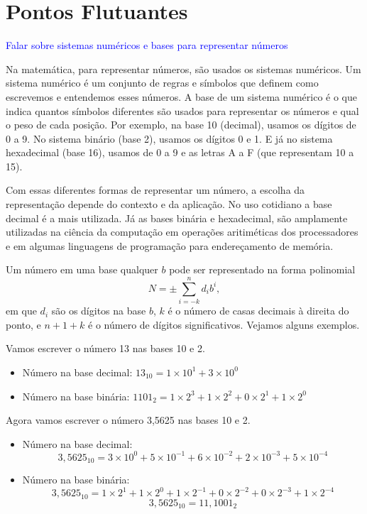 \chapter{Pontos Flutuantes}

\textcolor{blue}{Falar sobre sistemas numéricos e bases para representar números}

Na matemática, para representar números, são usados os sistemas numéricos. Um sistema numérico é um conjunto de regras e símbolos que definem como escrevemos e entendemos esses números. 
A base de um sistema numérico é o que indica quantos símbolos diferentes são usados para representar os números e qual o peso de cada posição. Por exemplo, na base 10 (decimal), usamos os dígitos de 0 a 9. No sistema binário (base 2), usamos os dígitos 0 e 1. E já no sistema hexadecimal (base 16), usamos de 0 a 9 e as letras A a F (que representam 10 a 15).

Com essas diferentes formas de representar um número, a escolha da representação depende do contexto e da aplicação. No uso cotidiano a base decimal é a mais utilizada. Já as bases binária e hexadecimal, são amplamente utilizadas na ciência da computação em operações aritiméticas dos processadores e em algumas linguagens de programação para endereçamento de memória.

Um número em uma base qualquer \(b\) pode ser representado na forma polinomial
\begin{equation}
N = \pm \sum_{i=-k}^{n} d_i b^i,
\end{equation}
em que \(d_i\) são os dígitos na base \(b\), \(k\) é o número de casas decimais à direita do ponto, e \(n+1+k\) é o número de dígitos significativos. Vejamos alguns exemplos.

\begin{ex}
Vamos escrever o número 13 nas bases 10 e 2.
\begin{itemize}
    \item Número na base decimal: \(13_{10} = 1 \times 10^1 + 3 \times 10^0\)
    \item Número na base binária: \(1101_2 = 1 \times 2^3 + 1 \times 2^2 + 0 \times 2^1 + 1 \times 2^0  \)
\end{itemize}
\end{ex}

\begin{ex}
Agora vamos escrever o número 3,5625 nas bases 10 e 2.

\begin{itemize}
    \item Número na base decimal: 
    \[
    3{,}5625_{10} = 3 \times 10^0 + 5 \times 10^{-1} + 6 \times 10^{-2} + 2 \times 10^{-3} + 5 \times 10^{-4}
    \]
    
    \item Número na base binária:
    \[
    3{,}5625_{10} = 1\times 2^{1} + 1 \times 2^0 + 1 \times 2^{-1} + 0 \times 2^{-2} + 0 \times 2^{-3} + 1 \times 2^{-4}
    \]
    \[
    3{,}5625_{10} = 11{,}1001_2
    \]
\end{itemize}
\end{ex}

